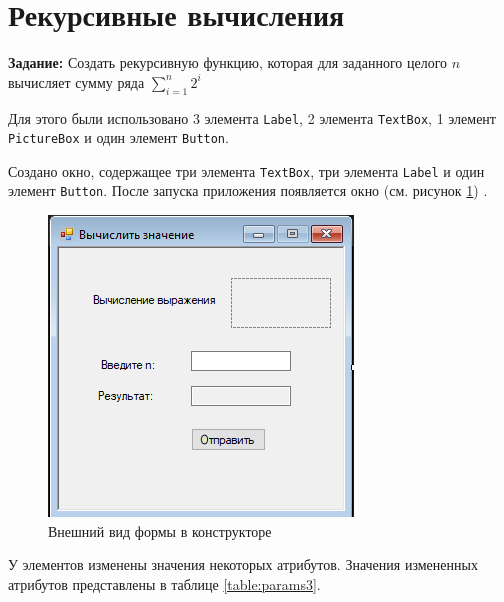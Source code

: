 \section{Рекурсивные вычисления}
\textbf{Задание:} Создать рекурсивную функцию, которая для заданного целого $n$
вычисляет сумму ряда $\displaystyle \sum\limits_{i=1}^n 2^i$

Для этого были использовано 3 элемента \verb|Label|, 2 элемента \verb|TextBox|, 1 элемент \verb|PictureBox|
и один элемент \verb|Button|. 

Создано окно, содержащее три элемента \verb|TextBox|, три элемента \verb|Label| и 
один элемент \verb|Button|. После запуска приложения появляется окно (см. рисунок \ref{fig:form3}) .
\begin{figure}[H]
    \centering
    \includegraphics{task3/form.png}
    \caption{Внешний вид формы в конструкторе}
    \label{fig:form3}
\end{figure}
У элементов изменены значения некоторых атрибутов. 
Значения измененных атрибутов представлены в таблице \ref{table:params3}.
